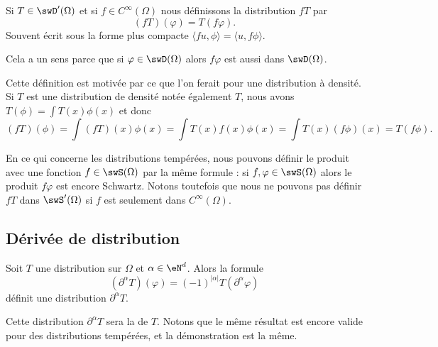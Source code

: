 \begin{definition}  \label{DefZVRNooDXAoTU}
Si \( T\in\swD'(\Omega)\) et si \( f\in  C^{\infty}(\Omega)\) nous définissons la distribution \( fT\) par
\begin{equation}    \label{DefTDkrqkA}
    (fT)(\varphi)=T(f\varphi).
\end{equation}
Souvent écrit sous la forme plus compacte \( \langle fu, \phi\rangle =\langle u, f\phi\rangle \).
\end{definition}
Cela a un sens parce que si \( \varphi\in\swD(\Omega)\) alors \( f\varphi\) est aussi dans \( \swD(\Omega)\).

Cette définition est motivée par ce que l'on ferait pour une distribution à densité. Si \( T\) est une distribution de densité notée également \( T\), nous avons \( T(\phi)=\int T(x)\phi(x)\) et donc
\begin{equation}
    (fT)(\phi)=\int (fT)(x)\phi(x)=\int T(x)f(x)\phi(x)=\int T(x)(f\phi)(x)=T(f\phi).
\end{equation}

En ce qui concerne les distributions tempérées, nous pouvons définir le produit avec une fonction \( f\in\swS(\Omega)\) par la même formule : si \( f,\varphi\in\swS(\Omega)\) alors le produit \( f\varphi\) est encore Schwartz. Notons toutefois que nous ne pouvons pas définir \( fT\) dans \( \swS'(\Omega)\) si \( f\) est seulement dans \(  C^{\infty}(\Omega)\).

\subsection{Dérivée de distribution}

\begin{propositionDef} \label{PropKJLrfSX}
    Soit \( T\) une distribution sur \( \Omega\) et \( \alpha\in \eN^d\). Alors la formule
    \begin{equation}
        (\partial^{\alpha}T)(\varphi)=(-1)^{| \alpha |}T(\partial^{\alpha}\varphi)
    \end{equation}
    définit une distribution \( \partial^{\alpha}T\).

    Cette distribution \( \partial^{\alpha}T\) sera la  de \( T\). Notons que le même résultat est encore valide pour des distributions tempérées, et la démonstration est la même.
\end{propositionDef}

